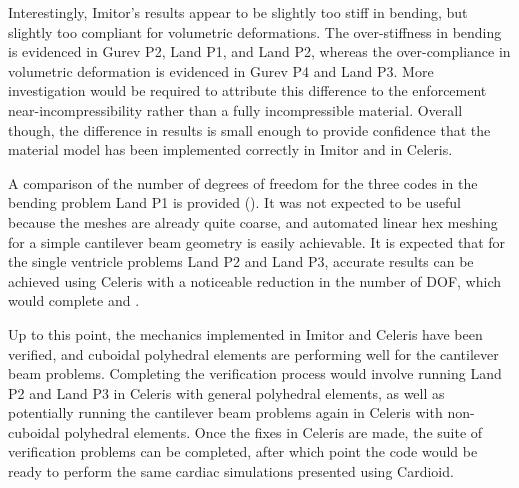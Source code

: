 Interestingly, Imitor's results appear to be slightly too stiff in bending, but slightly too compliant for volumetric deformations. The over-stiffness in bending is evidenced in Gurev P2, Land P1, and Land P2, whereas the over-compliance in volumetric deformation is evidenced in Gurev P4 and Land P3. More investigation would be required to attribute this difference to the enforcement near-incompressibility rather than a fully incompressible material. Overall though, the difference in results is small enough to provide confidence that the material model has been implemented correctly in Imitor and in Celeris.

A comparison of the number of degrees of freedom for the three codes in the bending problem Land P1 is provided (). It was not expected to be useful because the meshes are already quite coarse, and automated linear hex meshing for a simple cantilever beam geometry is easily achievable. It is expected that for the single ventricle problems Land P2 and Land P3, accurate results can be achieved using Celeris with a noticeable reduction in the number of DOF, which would complete  and .

Up to this point, the mechanics implemented in Imitor and Celeris have been verified, and cuboidal polyhedral elements are performing well for the cantilever beam problems. Completing the verification process would involve running Land P2 and Land P3 in Celeris with general polyhedral elements, as well as potentially running the cantilever beam problems again in Celeris with non-cuboidal polyhedral elements. Once the fixes in Celeris are made, the suite of verification problems can be completed, after which point the code would be ready to perform the same cardiac simulations presented using Cardioid.

